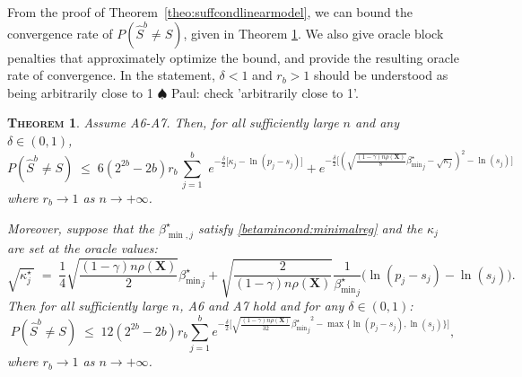 \documentclass[aos]{imsart}
\theoremstyle{plain}
\newtheorem{thm}{\textsc{Theorem}}[section]
\newcommand{\paul}[1]{{\small{\color{green} \sf $\spadesuit$ Paul: #1}}}
\newcommand{\bs}{\boldsymbol}
\begin{document}
From the proof of Theorem~\ref{theo:suffcondlinearmodel}, we can bound the convergence rate of $P(\hat S^{b}\neq S)$, given in Theorem \ref{prop:fullrecovreg}. We also give oracle block penalties that approximately optimize the bound, and provide the resulting oracle rate of convergence. 
In the statement, $\delta<1$ and $r_b>1$ should be understood as being arbitrarily close to 1 \paul{check 'arbitrarily close to 1'}.
\begin{thm}\label{prop:fullrecovreg}
Assume A6-A7. Then, for all sufficiently large $n$ and any $\delta \in (0,1)$,
\begin{equation}\label{eq:rateconvreg}
 P(\hat{S}^{b} \neq S)\;\leq\; 6(2^{2b}-2b)r_b\,\sum_{j=1}^b\,\, e^{-\tfrac{\delta}{2}\big[\kappa_j-\ln(p_j-s_j)\big]} + 
    e^{-\tfrac{\delta}{2}\big[(\sqrt{\frac{(1-\gamma) n\rho(\bs X)}{8}}{{\beta_{\min}^{\star}}_j} - \sqrt{\kappa_j})^2 -\ln(s_j) \big]}
\end{equation}
where $r_b\to 1$ as $n\to +\infty$.

Moreover, suppose that the $\beta^\star_{\min,j}$ satisfy \eqref{betamincond:minimalreg} and the $\kappa_j$ are set at the oracle values:
	\begin{equation} \label{eq:oraclepenreg}
\sqrt{\kappa^\star_j\,} \;=\; \frac14\sqrt{\frac{(1-\gamma) n\rho(\bs X)}{2}}{{\beta_{\min}^{\star}}_j}+\sqrt{\frac{2}{(1-\gamma) n\rho(\bs X)}}\frac{1}{{\beta_{\min}^{\star}}_j}\big(\ln({p_j-s_j})-\ln({s_j})\big).
\end{equation}
Then for all sufficiently large $n$, A6 and A7 hold and for any $\delta \in (0,1)$: 
\begin{equation}\label{eq:oraclerateconvreg}
    P(\hat{S}^{b} \neq S) \; \leq \; 12(2^{2b}-2b)r_b \sum_{j=1}^b e^{-\tfrac{\delta}{2}\big[\sqrt{\frac{(1-\gamma) n\rho(\bs X)}{32}}{{\beta_{\min}^{\star}}_j}^2-\max\{\ln(p_j-s_j),\ln(s_j)\}\big]},
\end{equation}
where $r_b\to 1$ as $n\to+\infty$.
\end{thm}
\end{document}
